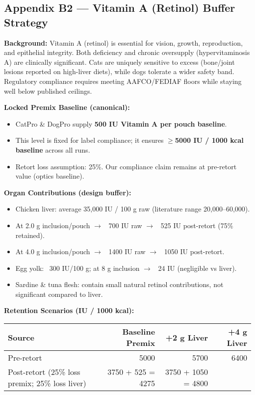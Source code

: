 \subsection*{Appendix B2 --- Vitamin A (Retinol) Buffer Strategy\cite{ref4,ref5}}

\textbf{Background:}  
Vitamin A (retinol) is essential for vision, growth, reproduction, and epithelial integrity. Both deficiency and chronic oversupply (hypervitaminosis A) are clinically significant\cite{ref4}. Cats are uniquely sensitive to excess (bone/joint lesions reported on high-liver diets), while dogs tolerate a wider safety band. Regulatory compliance requires meeting AAFCO/FEDIAF floors while staying well below published ceilings.

\textbf{Locked Premix Baseline (canonical):}  
\begin{itemize}[leftmargin=1.2em]
  \item CatPro \& DogPro supply \textbf{500 IU Vitamin A per pouch baseline}.  
  \item This level is fixed for label compliance; it ensures \textbf{$\geq$5000 IU / 1000 kcal baseline} across all runs.  
  \item Retort loss assumption: 25\%. Our compliance claim remains at pre-retort value (optics baseline).  
\end{itemize}

\textbf{Organ Contributions (design buffer):}  
\begin{itemize}[leftmargin=1.2em]
  \item Chicken liver: average 35,000 IU / 100 g raw (literature range 20,000--60,000).  
  \item At 2.0 g inclusion/pouch $\rightarrow$ ~700 IU raw $\rightarrow$ ~525 IU post-retort (75\% retained).  
  \item At 4.0 g inclusion/pouch $\rightarrow$ ~1400 IU raw $\rightarrow$ ~1050 IU post-retort.  
  \item Egg yolk: ~300 IU/100 g; at 8 g inclusion $\rightarrow$ ~24 IU (negligible vs liver).  
  \item Sardine \& tuna flesh: contain small natural retinol contributions, not significant compared to liver.  
\end{itemize}

\textbf{Retention Scenarios (IU / 1000 kcal):}

\begin{tabular}{lrrr}
\toprule
Source & Baseline Premix & +2 g Liver & +4 g Liver \\
\midrule
Pre-retort & 5000 & 5700 & 6400 \\
Post-retort (25\% loss premix; 25\% loss liver) & 3750 + 525 = 4275 & 3750 + 1050 = 4800 \\
\bottomrule
\end{tabular}

